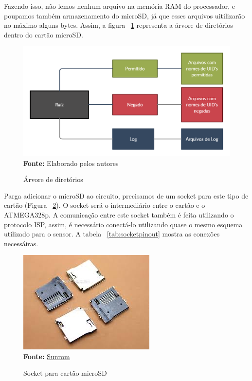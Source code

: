 Fazendo isso, não lemos nenhum arquivo na memória RAM do processador,
e poupamos também armazenamento do microSD, já que esses arquivos
uitilizarão no máximo alguns bytes. Assim, a figura ~\ref{fig:arvore}
representa a árvore de diretórios dentro do cartão microSD.

\FloatBarrier
\begin{figure}[!htbp]
	\centering
	\caption{Árvore de diretórios}
	\includegraphics[scale=.3]{imagens/arvore}
	\\\textbf{Fonte:} Elaborado pelos autores
	\label{fig:arvore}
\end{figure}
\FloatBarrier

Parga adicionar o microSD ao circuito, precisamos de um socket
para este tipo de cartão (Figura ~\ref{fig:socket}). O socket será o intermediário entre
o cartão e o ATMEGA328p. A comunicação entre este socket também
é feita utilizando o protocolo ISP, assim, é necessário conectá-lo
utilizando quase o mesmo esquema utilizado para o sensor. A tabela
~\ref{tab:socketpinout} mostra as conexões necessáiras.

\FloatBarrier
\begin{figure}[!htbp]
	\centering
	\caption{Socket para cartão microSD}
	\includegraphics[scale=.5]{imagens/socket}
	\\\textbf{Fonte:} \href{https://www.sunrom.com/p/micro-sd-memory-card-socket}{Sunrom}
	\label{fig:socket}
\end{figure}
\FloatBarrier

